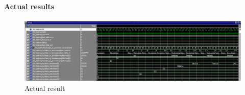 \paragraph{Actual results}


\begin{figure}[h]
		\centerline{\includegraphics[width=550px]{figures/toplevel_tb_result}}
		\caption{Actual result}
\end{figure}

